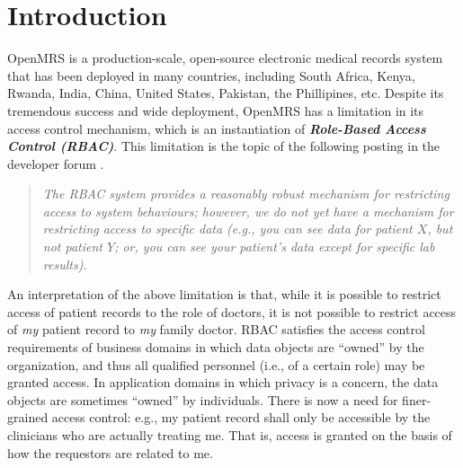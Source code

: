 \documentclass{acm_proc_article-sp}
\newcommand{\Dfn}[1]{\textbf{\emph{#1}}}
\begin{document}



\section{Introduction}

OpenMRS \cite{OpenMRS} is a production-scale, open-source electronic medical records
system that has been deployed in many countries, including South
Africa, Kenya, Rwanda, India, China, United States, Pakistan, the
Phillipines, etc.  Despite its tremendous success and wide deployment,
OpenMRS has a limitation in its access control mechanism, which is an
instantiation of \Dfn{Role-Based Access Control (RBAC)}. This
limitation is the topic of the following posting in the developer
forum \cite{OpenMRSPosting}.
\begin{quote}
  \emph{The RBAC system provides a reasonably robust mechanism for
    restricting access to system behaviours; however, we do not yet
    have a mechanism for restricting access to specific data (e.g.,
    you can see data for patient $X$, but not patient $Y$; or, you can
    see your patient's data except for specific lab results).}
\end{quote}
An interpretation of the above limitation is that, while it is
possible to restrict access of patient records to the role of doctors,
it is not possible to restrict access of \emph{my} patient record to
\emph{my} family doctor.  RBAC satisfies the access control
requirements of business domains in which data objects are ``owned''
by the organization, and thus all qualified personnel (i.e., of a
certain role) may be granted access.  In application domains in which
privacy is a concern, the data objects are sometimes ``owned'' by
individuals. There is now a need for finer-grained access control:
e.g., my patient record shall only be accessible by the clinicians who
are actually treating me.  That is, access is granted on the basis of
how the requestors are related to me.
\end{document}
